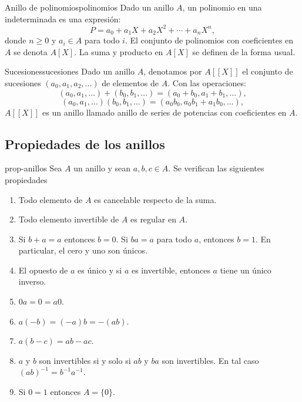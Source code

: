\begin{example}{Anillo de polinomios}{polinomios}
    Dado un anillo \( A \), un polinomio en una indeterminada es una expresión:
    \[
    P = a_0 + a_1 X + a_2 X^2 + \cdots + a_n X^n,
    \]
    donde \( n \geq 0 \) y \( a_i \in A \) para todo \( i \). El conjunto de polinomios con coeficientes en \( A \) se denota \( A[X] \). La suma y producto en \( A[X] \) se definen de la forma usual.
\end{example}

\begin{example}{Sucesiones}{sucesiones}
    Dado un anillo \( A \), denotamos por \( A[[X]] \) el conjunto de sucesiones \((a_0, a_1, a_2, \ldots)\) de elementos de \( A \). Con las operaciones:
    \[
    (a_0, a_1, \ldots) + (b_0, b_1, \ldots) = (a_0 + b_0, a_1 + b_1, \ldots),
    \]
    \[
    (a_0, a_1, \ldots)(b_0, b_1, \ldots) = (a_0 b_0, a_0 b_1 + a_1 b_0, \ldots),
    \]
    \( A[[X]] \) es un anillo llamado anillo de series de potencias con coeficientes en \( A \).
\end{example}

\subsection{Propiedades de los anillos}

\begin{lemma}{}{prop-anillos}
    Sea $A$ un anillo y sean $a,b,c \in A$. Se verifican las siguientes propiedades
    \begin{enumerate}
        \item Todo elemento de $A$ es cancelable respecto de la suma.
        \item Todo elemento invertible de $A$ es regular en $A$.
        \item Si $b + a = a$ entonces $b=0$. Si $ba=a$ para todo $a$, entonces $b=1$. En particular, el cero y uno son únicos.
        \item El opuesto de $a$ es único y si $a$ es invertible, entonces $a$ tiene un único inverso.
        \item $0a=0=a0$.
        \item $a(-b)=(-a)b=-(ab)$.
        \item $a(b-c)=ab-ac$.
        \item $a$ y $b$ son invertibles si y solo si $ab$ y $ba$ son invertibles. En tal caso $(ab)^{-1}=b^{-1}a^{-1}$.
        \item Si $0=1$ entonces $A=\{0\}$.
    \end{enumerate}
\end{lemma}

